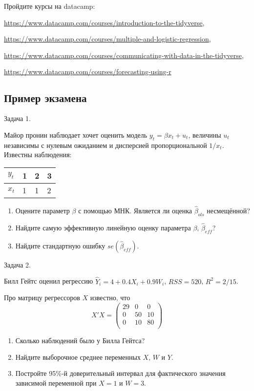 \documentclass[11pt,russian,]{article}
\begin{document}
Пройдите курсы на datacamp:

\url{https://www.datacamp.com/courses/introduction-to-the-tidyverse},

\url{https://www.datacamp.com/courses/multiple-and-logistic-regression},

\url{https://www.datacamp.com/courses/communicating-with-data-in-the-tidyverse},

\url{https://www.datacamp.com/courses/forecasting-using-r}

\hypertarget{-}{%
\subsection{Пример экзамена}\label{-}}

Задача 1.

Майор пронин наблюдает хочет оценить модель \(y_t = \beta x_t + u_t\),
величины \(u_t\) независимы с нулевым ожиданием и дисперсией
пропорциональной \(1/x_t\). Известны наблюдения:

\begin{longtable}[]{@{}llll@{}}
\toprule
\(y_t\) & 1 & 2 & 3\tabularnewline
\midrule
\endhead
\(x_t\) & 1 & 1 & 2\tabularnewline
\bottomrule
\end{longtable}

\begin{enumerate}
 \item Оцените параметр $\beta$ с помощью МНК. Является ли оценка $\hat\beta_{ols}$ несмещённой? 
 \item Найдите самую эффективную линейную оценку параметра $\beta$, $\hat\beta_{eff}$? 
 \item Найдите стандартную ошибку $se(\hat\beta_{eff})$.
\end{enumerate}

Задача 2.

Билл Гейтс оценил регрессию \(\hat Y_i = 4 + 0.4 X_i + 0.9 W_i\),
\(RSS = 520\), \(R^2 = 2/15\).

Про матрицу регрессоров \(X\) известно, что \[
X'X = \begin{pmatrix}
    29 & 0 & 0 \\
    0 & 50 & 10 \\
    0 & 10 & 80 \\
\end{pmatrix}
\]

\begin{enumerate}
 \item Сколько наблюдений было у Билла Гейтса?
 \item Найдите выборочное среднее переменных $X$, $W$ и $Y$.
 \item Постройте 95\%-й доверительный интервал для фактического значения зависимой переменной при $X=1$ и $W=3$.
\end{enumerate}
\end{document}
